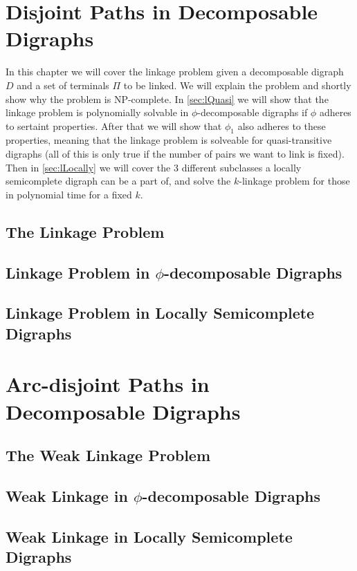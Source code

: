 \chapter{Disjoint Paths in Decomposable Digraphs}
\label{chap:linkage}
In this chapter we will cover the linkage problem given a decomposable digraph $D$ and a set of terminals $\Pi$ to be linked. 
We will explain the problem and shortly show why the problem is NP-complete. 
In \autoref{sec:lQuasi} we will show that the linkage problem is polynomially solvable in $\phi$-decomposable digraphs if $\phi$ adheres to sertaint properties. 
After that we will show that $\phi_1$ also adheres to these properties, meaning that the linkage problem is solveable for quasi-transitive digraphs (all of this is only true if the number of pairs we want to link is fixed). Then in \autoref{sec:lLocally} we will cover the 3 different subclasses a locally semicomplete digraph can be a part of, and solve the $k$-linkage problem for those in polynomial time for a fixed $k$. 
\section{The Linkage Problem}
\label{sec:lNP}


\section{Linkage Problem in $\phi$-decomposable Digraphs}
\label{sec:lQuasi}


\section{Linkage Problem in Locally Semicomplete Digraphs}
\label{sec:lLocally}


\chapter{Arc-disjoint Paths in Decomposable Digraphs}
\label{chap:weak}

\section{The Weak Linkage Problem}
\label{sec:wNP}


\section{Weak Linkage in $\phi$-decomposable Digraphs}
\label{sec:wQuasi}


\section{Weak Linkage in Locally Semicomplete Digraphs}
\label{sec:wLocally}



